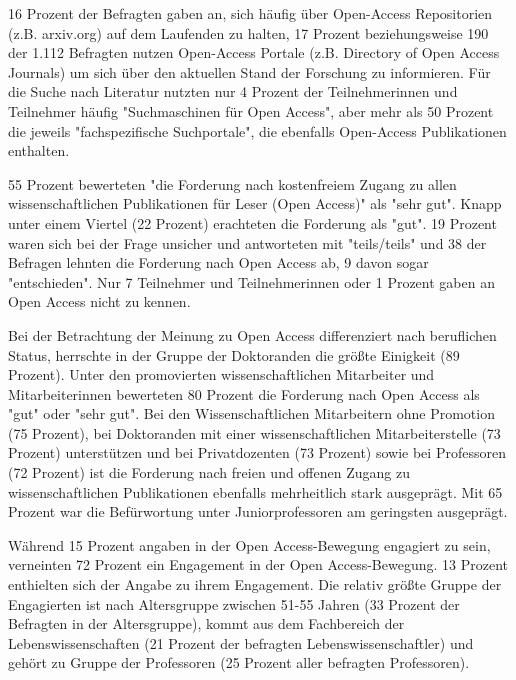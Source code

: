 16 Prozent der Befragten gaben an, sich häufig über Open-Access Repositorien (z.B. arxiv.org) auf dem Laufenden zu halten, 17 Prozent beziehungsweise 190 der 1.112 Befragten nutzen Open-Access Portale (z.B. Directory of Open Access Journals) um sich über den aktuellen Stand der Forschung zu informieren. Für die Suche nach Literatur nutzten nur 4 Prozent der Teilnehmerinnen und Teilnehmer häufig "Suchmaschinen für Open Access", aber mehr als 50 Prozent die jeweils "fachspezifische Suchportale", die ebenfalls Open-Access Publikationen enthalten.

55 Prozent bewerteten "die Forderung nach kostenfreiem Zugang zu allen wissenschaftlichen Publikationen für Leser (Open Access)" als "sehr gut". Knapp unter einem Viertel (22 Prozent) erachteten die Forderung als "gut". 19 Prozent waren sich bei der Frage unsicher und antworteten mit "teils/teils" und 38 der Befragen lehnten die Forderung nach Open Access ab, 9 davon sogar "entschieden". Nur 7 Teilnehmer und Teilnehmerinnen oder 1 Prozent gaben an Open Access nicht zu kennen.

Bei der Betrachtung der Meinung zu Open Access differenziert nach beruflichen Status, herrschte in der Gruppe der Doktoranden die größte Einigkeit (89 Prozent). Unter den promovierten wissenschaftlichen Mitarbeiter und Mitarbeiterinnen bewerteten 80 Prozent die Forderung nach Open Access als "gut" oder "sehr gut". Bei den Wissenschaftlichen Mitarbeitern ohne Promotion (75 Prozent), bei Doktoranden mit einer wissenschaftlichen Mitarbeiterstelle (73 Prozent) unterstützen und bei Privatdozenten (73 Prozent) sowie bei Professoren (72 Prozent) ist die Forderung nach freien und offenen Zugang zu wissenschaftlichen Publikationen ebenfalls mehrheitlich stark ausgeprägt. Mit 65 Prozent war die Befürwortung unter Juniorprofessoren am geringsten ausgeprägt.

Während 15 Prozent angaben in der Open Access-Bewegung engagiert zu sein, verneinten 72 Prozent ein Engagement in der Open Access-Bewegung. 13 Prozent enthielten sich der Angabe zu ihrem Engagement. Die relativ größte Gruppe der Engagierten ist nach Altersgruppe zwischen 51-55 Jahren (33 Prozent der Befragten in der Altersgruppe), kommt aus dem Fachbereich der Lebenswissenschaften (21 Prozent der befragten Lebenswissenschaftler) und gehört zu Gruppe der Professoren (25 Prozent aller befragten Professoren).

